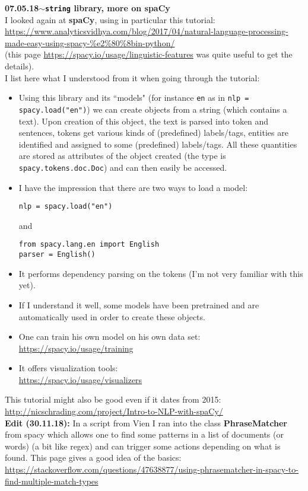 \documentclass[11pt,a4paper]{article}
\newenvironment{loggentry}[2]%
{\noindent\textbf{#1}\hspace{1cm}$\mathbf{\sim}$\text{ }\textbf{#2}\\}{\vspace{0.5cm}}
\begin{document}
\begin{loggentry}{07.05.18}{\texttt{string} library, more on spaCy}
I looked again at \textbf{spaCy}, using in particular this tutorial:\\
\url{https://www.analyticsvidhya.com/blog/2017/04/natural-language-processing-made-easy-using-spacy-%e2%80%8bin-python/}\\
(this page
\url{https://spacy.io/usage/linguistic-features}
was quite useful to get the details).\\ 
I list here what I understood from it when going through the tutorial:
\begin{itemize}
\item Using this library and its ``models" (for instance \texttt{en} as in \texttt{nlp = spacy.load("en")}) we can create objects from a string (which contains a text). Upon creation of this object, the text is parsed into token and sentences, tokens get various kinds of (predefined) labels/tags, entities are identified and assigned to some (predefined) labels/tags. All these quantities are stored as attributes of the object created (the type is \texttt{spacy.tokens.doc.Doc}) and can then easily be accessed.
\item I have the impression that there are two ways to load a model:
\begin{verbatim}
nlp = spacy.load("en")
\end{verbatim}
and
\begin{verbatim}
from spacy.lang.en import English
parser = English()
\end{verbatim}
\item It performs dependency parsing on the tokens (I'm not very familiar with this yet).
\item If I understand it well, some models have been pretrained and are automatically used in order to create these objects.
\item One can train his own model on his own data set:\\
\url{https://spacy.io/usage/training}\\
\item It offers visualization tools:\\
\url{https://spacy.io/usage/visualizers}\\
\end{itemize}
This tutorial might also be good even if it dates from 2015:\\
\url{http://nicschrading.com/project/Intro-to-NLP-with-spaCy/}\\

\textbf{Edit (30.11.18):} In a script from Vien I ran into the class \textbf{PhraseMatcher} from spacy which allows one to find some patterns in a list of documents (or words) (a bit like regex) and can trigger some actions depending on what is found. This page gives a good idea of the basics:\\
\url{https://stackoverflow.com/questions/47638877/using-phrasematcher-in-spacy-to-find-multiple-match-types}\\

\end{loggentry}
\end{document}
